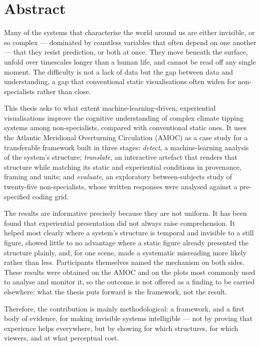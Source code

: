 
\chapter*{Abstract}

Many of the systems that characterise the world around us are either invisible, or so complex --- dominated by countless variables that often depend on one another --- that they resist prediction, or both at once. They move beneath the surface, unfold over timescales longer than a human life, and cannot be read off any single moment. The difficulty is not a lack of data but the gap between data and understanding, a gap that conventional static visualisations often widen for non-specialists rather than close.

This thesis asks to what extent machine-learning-driven, experiential visualisations improve the cognitive understanding of complex climate tipping systems among non-specialists, compared with conventional static ones. It uses the Atlantic Meridional Overturning Circulation (AMOC) as a case study for a transferable framework built in three stages: \emph{detect}, a machine-learning analysis of the system's structure; \emph{translate}, an interactive artefact that renders that structure while matching its static and experiential conditions in provenance, framing and units; and \emph{evaluate}, an exploratory between-subjects study of twenty-five non-specialists, whose written responses were analysed against a pre-specified coding grid.

The results are informative precisely because they are not uniform. It has been found that experiential presentation did not always raise comprehension. It helped most clearly where a system's structure is temporal and invisible to a still figure, showed little to no advantage where a static figure already presented the structure plainly, and, for one scene, made a systematic misreading more likely rather than less. Participants themselves named the mechanism on both sides. These results were obtained on the AMOC and on the plots most commonly used to analyse and monitor it, so the outcome is not offered as a finding to be carried elsewhere: what the thesis puts forward is the framework, not the result.

Therefore, the contribution is mainly methodological: a framework, and a first body of evidence, for making invisible systems intelligible --- not by proving that experience helps everywhere, but by showing for which structures, for which viewers, and at what perceptual cost.

\cleardoublepage
